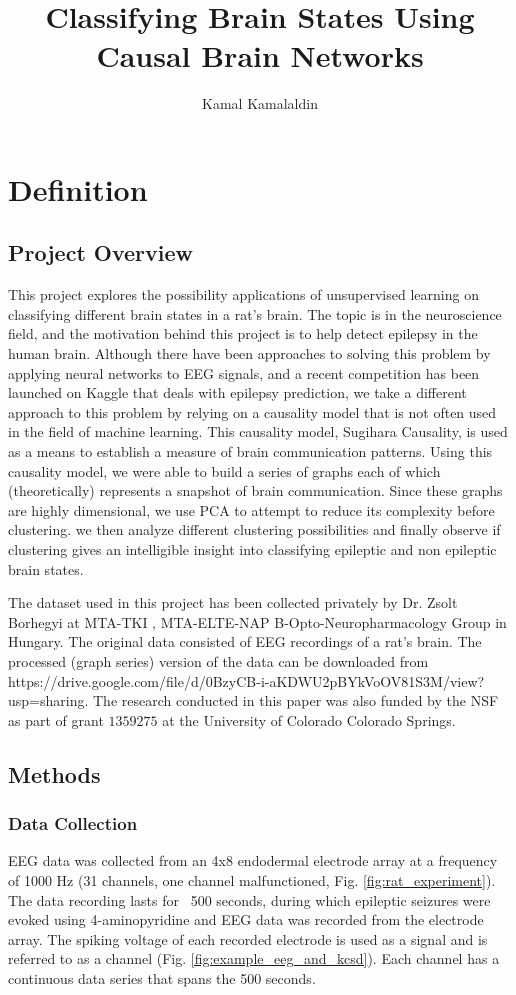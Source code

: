 \documentclass[journal,12pt,onecolumn,draftclsnofoot]{IEEEtran}  %
\title{Classifying Brain States Using Causal Brain Networks}
\author{Kamal Kamalaldin}
\begin{document}
\maketitle

\section{Definition}
\subsection{Project Overview}
This project explores the possibility applications of unsupervised learning on classifying different brain states in a rat's brain. The topic is in the neuroscience field, and the motivation behind this project is to help detect epilepsy in the human brain. Although there have been approaches to solving this problem by applying neural networks to EEG signals, and a recent competition has been launched on Kaggle that deals with epilepsy prediction, we take a different approach to this problem by relying on a causality model that is not often used in the field of machine learning. This causality model, Sugihara Causality, is used as a means to establish a measure of brain communication patterns. Using this causality model, we were able to build a series of graphs each of which (theoretically) represents a snapshot of brain communication. Since these graphs are highly dimensional, we use PCA to attempt to reduce its complexity before clustering. we then analyze different clustering possibilities and finally observe if clustering gives an intelligible insight into classifying epileptic and non epileptic brain states. 


The dataset used in this project has been collected privately by Dr. Zsolt Borhegyi at MTA-TKI , MTA-ELTE-NAP B-Opto-Neuropharmacology Group in Hungary. The original data consisted of EEG recordings of a rat's brain. The processed (graph series) version of the data can be downloaded from https://drive.google.com/file/d/0BzyCB-i-aKDWU2pBYkVoOV81S3M/view?usp=sharing. The research conducted in this paper was also funded by the NSF as part of grant $1359275$ at the University of Colorado Colorado Springs. 

\subsection{Methods}
\subsubsection{Data Collection}
EEG data was collected from an 4x8 endodermal electrode array at a frequency of 1000 Hz (31 channels, one channel malfunctioned, Fig. \ref{fig:rat_experiment}). The data recording lasts for ~500 seconds, during which epileptic seizures were evoked using 4-aminopyridine and EEG data was recorded from the electrode array. The spiking voltage of each recorded electrode is used as a signal and is referred to as a channel (Fig. \ref{fig:example_eeg_and_kcsd}). Each channel has a continuous data series that spans the 500 seconds.
\end{document}
